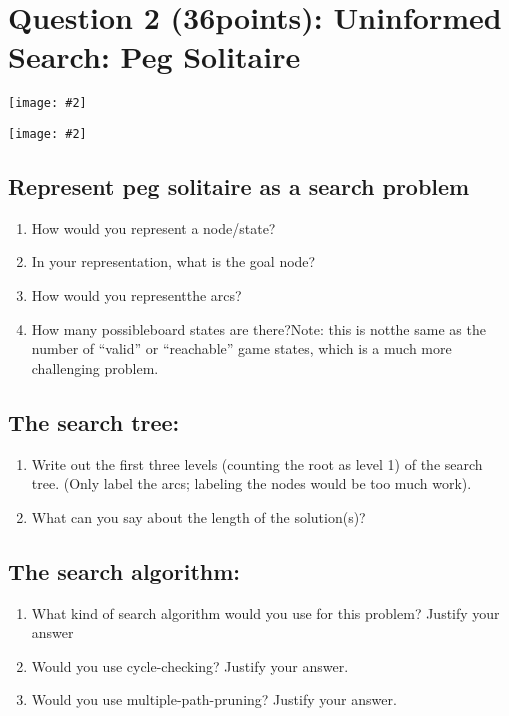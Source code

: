 \documentclass{article}
\newcommand{\centerfig}[2]{\begin{center}\texttt{[image: \#2]}\end{center}}
\begin{document}
\clearpage
\section{Question 2 (36points): Uninformed Search: Peg Solitaire}
\centerfig{1}{../figs/2_solitaire}
\centerfig{0.8}{../figs/3_solitaire}

\subsection{Represent peg solitaire as a search problem}
\begin{enumerate}[label=(\alph*)]
    \item How would you represent a node/state?
    \item In your representation, what is the goal node?
    \item How would you representthe arcs?
    \item How many possibleboard states are there?Note: this is notthe same as the number of “valid” or “reachable” game states, which is a much more challenging problem.
\end{enumerate}

\subsection{The search tree:}
\begin{enumerate}[label=(\alph*)]
    \item Write out the first three levels (counting the root as level 1) of the search tree. (Only label the arcs; labeling the nodes would be too much work).
    \item What can you say about the length of the solution(s)?
\end{enumerate}

\subsection{The search algorithm:}
\begin{enumerate}[label=(\alph*)]
    \item What kind of search algorithm would you use for this problem? Justify your answer
    \item Would you use cycle-checking? Justify your answer.
    \item Would you use multiple-path-pruning? Justify your answer.
\end{enumerate}

\end{document}
